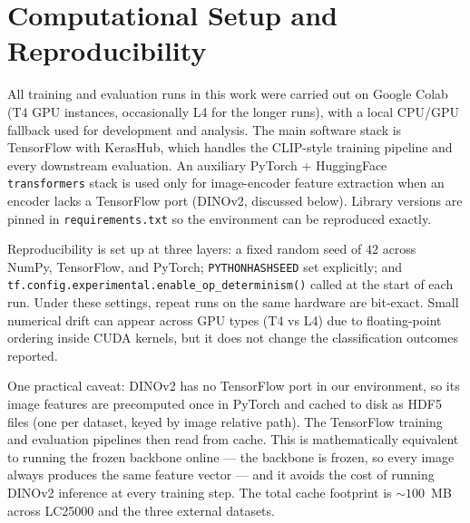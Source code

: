 \section{Computational Setup and Reproducibility}
\label{sec:meth-compute}

All training and evaluation runs in this work were carried out on Google Colab (T4 GPU instances, occasionally L4 for the longer runs), with a local CPU/GPU fallback used for development and analysis. The main software stack is TensorFlow with KerasHub, which handles the CLIP-style training pipeline and every downstream evaluation. An auxiliary PyTorch + HuggingFace \texttt{transformers} stack is used only for image-encoder feature extraction when an encoder lacks a TensorFlow port (DINOv2, discussed below). Library versions are pinned in \texttt{requirements.txt} so the environment can be reproduced exactly.

Reproducibility is set up at three layers: a fixed random seed of $42$ across NumPy, TensorFlow, and PyTorch; \texttt{PYTHONHASHSEED} set explicitly; and \texttt{tf.config.experimental.enable\_op\_determinism()} called at the start of each run. Under these settings, repeat runs on the same hardware are bit-exact. Small numerical drift can appear across GPU types (T4 vs L4) due to floating-point ordering inside CUDA kernels, but it does not change the classification outcomes reported.

One practical caveat: DINOv2 has no TensorFlow port in our environment, so its image features are precomputed once in PyTorch and cached to disk as HDF5 files (one per dataset, keyed by image relative path). The TensorFlow training and evaluation pipelines then read from cache. This is mathematically equivalent to running the frozen backbone online --- the backbone is frozen, so every image always produces the same feature vector --- and it avoids the cost of running DINOv2 inference at every training step. The total cache footprint is $\sim 100$~MB across LC25000 and the three external datasets.

